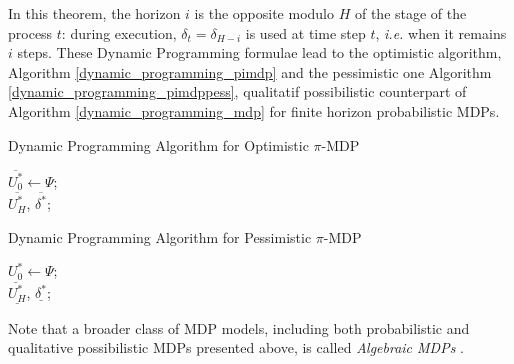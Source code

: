 In this theorem, the horizon $i$ is the opposite modulo $H$ 
of the stage of the process $t$: during execution,
$\delta_{t} = \delta_{H-i}$ is used at time step $t$,
\textit{i.e.} when it remains $i$ steps. 
These Dynamic Programming formulae 
lead to the optimistic algorithm, Algorithm \ref{dynamic_programming_pimdp} and 
the pessimistic one Algorithm \ref{dynamic_programming_pimdppess},
qualitatif possibilistic counterpart of Algorithm \ref{dynamic_programming_mdp}
for finite horizon probabilistic MDPs.
\begin{algorithm}
 \caption{Dynamic Programming Algorithm for Optimistic $\pi$-MDP} \label{dynamic_programming_pimdp}
$\overline{U^*_0} \gets \Psi$;\\
\Return $\overline{U^*_H}$, $\overline{\delta^*}$;
\end{algorithm}

\begin{algorithm}
 \caption{Dynamic Programming Algorithm for Pessimistic $\pi$-MDP} \label{dynamic_programming_pimdppess}
$\underline{U^*_0} \gets \Psi$;\\
\Return $\underline{U^*_H}$, $\underline{\delta^*}$;
\end{algorithm}

Note that a broader class of MDP models, 
including both probabilistic and qualitative possibilistic MDPs presented above,
is called \textit{Algebraic MDPs} \cite{LIP67955}. 

